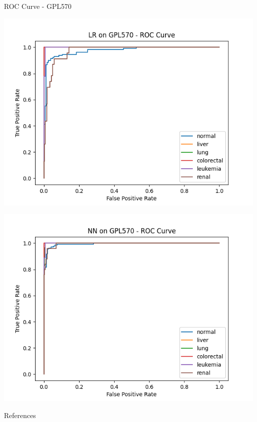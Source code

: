 \documentclass{beamer}
\begin{document}
    \begin{frame}{ROC Curve - GPL570}
        \begin{center}
            \hspace{-60pt}
            \begin{minipage}{0.4\textwidth}
                \includegraphics[scale=.4]{LRonGPL570ROC.png}
            \end{minipage}
            \hspace{40pt}
            \begin{minipage}{0.4\textwidth}
                \includegraphics[scale=.4]{NNonGPL570ROC.png}
            \end{minipage}
        \end{center}
    \end{frame}
    \fi
    
    \begin{frame}{References}
    \end{frame}
\end{document}
